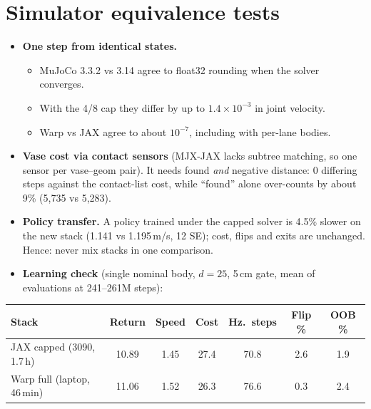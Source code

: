 \documentclass[sigconf,review]{acmart}
\begin{document}
\section{Simulator equivalence tests}
\label{app:equiv}
\begin{itemize}
\item \textbf{One step from identical states.}
  \begin{itemize}
  \item MuJoCo 3.3.2 vs 3.14 agree to float32 rounding when the solver converges.
  \item With the 4/8 cap they differ by up to $1.4\times10^{-3}$ in joint velocity.
  \item Warp vs JAX agree to about $10^{-7}$, including with per-lane bodies.
  \end{itemize}
\item \textbf{Vase cost via contact sensors} (MJX-JAX lacks subtree matching, so one sensor per vase--geom pair). It needs found \emph{and} negative distance: 0 differing steps against the contact-list cost, while ``found'' alone over-counts by about 9\% (5,735 vs 5,283).
\item \textbf{Policy transfer.} A policy trained under the capped solver is 4.5\% slower on the new stack (1.141 vs 1.195\,m/s, 12 SE); cost, flips and exits are unchanged. Hence: never mix stacks in one comparison.
\item \textbf{Learning check} (single nominal body, $d = 25$, 5\,cm gate, mean of evaluations at 241--261M steps):
\end{itemize}
\begin{center}
\footnotesize
\setlength{\tabcolsep}{3pt}
\begin{tabular}{lcccccc}
\toprule
Stack & Return & Speed & Cost & Hz.\ steps & Flip \% & OOB \% \\
\midrule
JAX capped (3090, 1.7\,h) & 10.89 & 1.45 & 27.4 & 70.8 & 2.6 & 1.9 \\
Warp full (laptop, 46\,min) & 11.06 & 1.52 & 26.3 & 76.6 & 0.3 & 2.4 \\
\bottomrule
\end{tabular}
\end{center}
\end{document}

